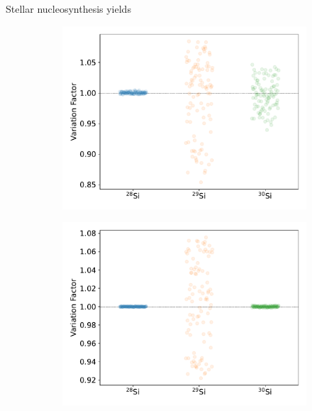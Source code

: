 \documentclass[10pt]{beamer}
\begin{document}
\begin{frame}{Stellar nucleosynthesis yields}
\begin{figure}
        \begin{subfigure}[b]{0.42\textwidth}
            \includegraphics[width=\textwidth]{figs/M20Z2E-2_mcyieldresult.pdf}
        \end{subfigure}
        \begin{subfigure}[b]{0.42\textwidth}
            \includegraphics[width=\textwidth]{figs/M20Z1E-2_mcyieldresult.pdf}
        \end{subfigure}
    \end{figure}
\end{frame}
\end{document}
